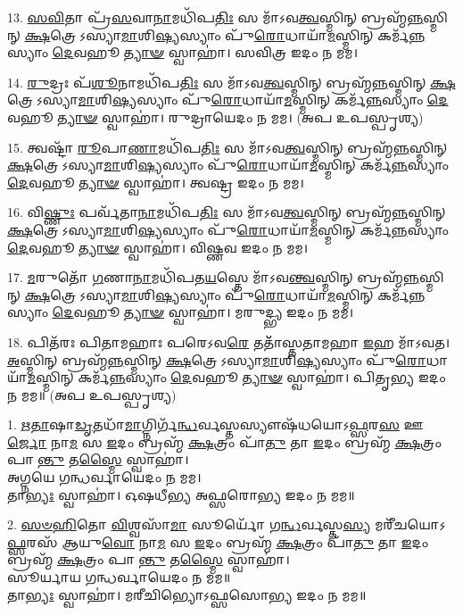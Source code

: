 13. \ul{𑌸}\-\-\ul{𑌵𑌿}\-𑌤𑌾 𑌪𑍍𑌰᳴\-\ul{𑌸}\-𑌵𑌾\-\ul{𑌨𑌾}\-𑌮𑌧𑌿᳴𑌪\-\ul{𑌤𑌿𑌃} 𑌸 𑌮𑌾᳴𑌽𑌵\-\ul{𑌤𑍍𑌵}\-𑌸𑍍𑌮𑌿𑌨𑍍 𑌬𑍍𑌰𑌹𑍍𑌮᳴\-\ul{𑌨𑍍𑌨}\-𑌸𑍍𑌮𑌿𑌨𑍍 \ul{𑌕𑍍𑌷}\-𑌤𑍍𑌰𑍇𑌽𑌸𑍍𑌯𑌾\-\ul{𑌮𑌾}\-𑌶𑌿\-\ul{𑌷𑍍𑌯}\-𑌸𑍍𑌯𑌾𑌂 𑌪𑍁᳴\-\ul{𑌰𑍋}\-𑌧𑌾𑌯𑌾᳴\-\ul{𑌮}\-𑌸𑍍𑌮𑌿𑌨𑍍 𑌕𑌰𑍍𑌮᳴\-\ul{𑌨𑍍𑌨}\-𑌸𑍍𑌯𑌾𑌂 \ul{𑌦𑍇}\-𑌵𑌹𑍂\-\ul{𑌤𑍍𑌯𑌾}\-\-\ul{𑍟} 𑌸𑍍𑌵𑌾𑌹𑌾॑। 𑌸𑌵𑌿𑌤𑍍𑌰 𑌇𑌦𑌂 𑌨 𑌮𑌮।

14. \ul{𑌰𑍁}\-𑌦𑍍𑌰𑌃 𑌪᳴\-\ul{𑌶𑍂}\-𑌨𑌾𑌮𑌧𑌿᳴𑌪\-\ul{𑌤𑌿𑌃} 𑌸 𑌮𑌾᳴𑌽𑌵\-\ul{𑌤𑍍𑌵}\-𑌸𑍍𑌮𑌿𑌨𑍍 𑌬𑍍𑌰𑌹𑍍𑌮᳴\-\ul{𑌨𑍍𑌨}\-𑌸𑍍𑌮𑌿𑌨𑍍 \ul{𑌕𑍍𑌷}\-𑌤𑍍𑌰𑍇𑌽𑌸𑍍𑌯𑌾\-\ul{𑌮𑌾}\-𑌶𑌿\-\ul{𑌷𑍍𑌯}\-𑌸𑍍𑌯𑌾𑌂 𑌪𑍁᳴\-\ul{𑌰𑍋}\-𑌧𑌾𑌯𑌾᳴\-\ul{𑌮}\-𑌸𑍍𑌮𑌿𑌨𑍍 𑌕𑌰𑍍𑌮᳴\-\ul{𑌨𑍍𑌨}\-𑌸𑍍𑌯𑌾𑌂 \ul{𑌦𑍇}\-𑌵𑌹𑍂\-\ul{𑌤𑍍𑌯𑌾}\-\-\ul{𑍟} 𑌸𑍍𑌵𑌾𑌹𑌾॑। 𑌰𑍁𑌦𑍍𑌰𑌾𑌯𑍇𑌦𑌂 𑌨 𑌮𑌮। (𑌅𑌪 𑌉𑌪𑌸𑍍𑌪𑍃𑌶𑍍𑌯)

15. 𑌤𑍍𑌵𑌷𑍍𑌟𑌾᳴ \ul{𑌰𑍂}\-𑌪𑌾\-\ul{𑌣𑌾}\-𑌮𑌧𑌿᳴𑌪\-\ul{𑌤𑌿𑌃} 𑌸 𑌮𑌾᳴𑌽𑌵\-\ul{𑌤𑍍𑌵}\-𑌸𑍍𑌮𑌿𑌨𑍍 𑌬𑍍𑌰𑌹𑍍𑌮᳴\-\ul{𑌨𑍍𑌨}\-𑌸𑍍𑌮𑌿𑌨𑍍 \ul{𑌕𑍍𑌷}\-𑌤𑍍𑌰𑍇𑌽𑌸𑍍𑌯𑌾\-\ul{𑌮𑌾}\-𑌶𑌿\-\ul{𑌷𑍍𑌯}\-𑌸𑍍𑌯𑌾𑌂 𑌪𑍁᳴\-\ul{𑌰𑍋}\-𑌧𑌾𑌯𑌾᳴\-\ul{𑌮}\-𑌸𑍍𑌮𑌿𑌨𑍍 𑌕𑌰𑍍𑌮᳴\-\ul{𑌨𑍍𑌨}\-𑌸𑍍𑌯𑌾𑌂 \ul{𑌦𑍇}\-𑌵𑌹𑍂\-\ul{𑌤𑍍𑌯𑌾}\-\-\ul{𑍟} 𑌸𑍍𑌵𑌾𑌹𑌾॑। 𑌤𑍍𑌵𑌷𑍍𑌟𑍍𑌰 𑌇𑌦𑌂 𑌨 𑌮𑌮।

16. 𑌵𑌿\-\ul{𑌷𑍍𑌣𑍁𑌃} 𑌪𑌰𑍍𑌵᳴𑌤𑌾\-\ul{𑌨𑌾}\-𑌮𑌧𑌿᳴𑌪\-\ul{𑌤𑌿𑌃} 𑌸 𑌮𑌾᳴𑌽𑌵\-\ul{𑌤𑍍𑌵}\-𑌸𑍍𑌮𑌿𑌨𑍍 𑌬𑍍𑌰𑌹𑍍𑌮᳴\-\ul{𑌨𑍍𑌨}\-𑌸𑍍𑌮𑌿𑌨𑍍 \ul{𑌕𑍍𑌷}\-𑌤𑍍𑌰𑍇𑌽𑌸𑍍𑌯𑌾\-\ul{𑌮𑌾}\-𑌶𑌿\-\ul{𑌷𑍍𑌯}\-𑌸𑍍𑌯𑌾𑌂 𑌪𑍁᳴\-\ul{𑌰𑍋}\-𑌧𑌾𑌯𑌾᳴\-\ul{𑌮}\-𑌸𑍍𑌮𑌿𑌨𑍍 𑌕𑌰𑍍𑌮᳴\-\ul{𑌨𑍍𑌨}\-𑌸𑍍𑌯𑌾𑌂 \ul{𑌦𑍇}\-𑌵𑌹𑍂\-\ul{𑌤𑍍𑌯𑌾}\-\-\ul{𑍟} 𑌸𑍍𑌵𑌾𑌹𑌾॑। 𑌵𑌿𑌷𑍍𑌣𑌵 𑌇𑌦𑌂 𑌨 𑌮𑌮।

17. \ul{𑌮}\-𑌰𑍁𑌤𑍋᳴ \ul{𑌗}\-𑌣𑌾\-\ul{𑌨𑌾}\-𑌮𑌧𑌿᳴𑌪𑌤\-\ul{𑌯}\-𑌸𑍍𑌤𑍇 𑌮𑌾᳴𑌽𑌵\-\ul{𑌨𑍍𑌤𑍍𑌵}\-𑌸𑍍𑌮𑌿𑌨𑍍 𑌬𑍍𑌰𑌹𑍍𑌮᳴\-\ul{𑌨𑍍𑌨}\-𑌸𑍍𑌮𑌿𑌨𑍍 \ul{𑌕𑍍𑌷}\-𑌤𑍍𑌰𑍇𑌽𑌸𑍍𑌯𑌾\-\ul{𑌮𑌾}\-𑌶𑌿\-\ul{𑌷𑍍𑌯}\-𑌸𑍍𑌯𑌾𑌂 𑌪𑍁᳴\-\ul{𑌰𑍋}\-𑌧𑌾𑌯𑌾᳴\-\ul{𑌮}\-𑌸𑍍𑌮𑌿𑌨𑍍 𑌕𑌰𑍍𑌮᳴\-\ul{𑌨𑍍𑌨}\-𑌸𑍍𑌯𑌾𑌂 \ul{𑌦𑍇}\-𑌵𑌹𑍂\-\ul{𑌤𑍍𑌯𑌾}\-\-\ul{𑍟} 𑌸𑍍𑌵𑌾𑌹𑌾॑। 𑌮𑌰𑍁𑌦𑍍𑌭𑍍𑌯 𑌇𑌦𑌂 𑌨 𑌮𑌮।

18. 𑌪𑌿𑌤᳴𑌰𑌃 𑌪𑌿𑌤𑌾𑌮𑌹𑌾𑌃 𑌪𑌰𑍇𑌽𑌵\-\ul{𑌰𑍇} 𑌤𑌤𑌾᳴᳴𑌸𑍍𑌤𑌤𑌾𑌮𑌹𑌾 \ul{𑌇}\-𑌹 𑌮𑌾᳴𑌽𑌵𑌤। \ul{𑌅}\-𑌸𑍍𑌮𑌿𑌨𑍍 𑌬𑍍𑌰𑌹𑍍𑌮᳴\-\ul{𑌨𑍍𑌨}\-𑌸𑍍𑌮𑌿𑌨𑍍 \ul{𑌕𑍍𑌷}\-𑌤𑍍𑌰𑍇𑌽𑌸𑍍𑌯𑌾\-\ul{𑌮𑌾}\-𑌶𑌿\-\ul{𑌷𑍍𑌯}\-𑌸𑍍𑌯𑌾𑌂 𑌪𑍁᳴\-\ul{𑌰𑍋}\-𑌧𑌾𑌯𑌾᳴\-\ul{𑌮}\-𑌸𑍍𑌮𑌿𑌨𑍍 𑌕𑌰𑍍𑌮᳴\-\ul{𑌨𑍍𑌨}\-𑌸𑍍𑌯𑌾𑌂 \ul{𑌦𑍇}\-𑌵𑌹𑍂\-\ul{𑌤𑍍𑌯𑌾}\-\-\ul{𑍟} 𑌸𑍍𑌵𑌾𑌹𑌾॑। 𑌪𑌿𑌤𑍃𑌭𑍍𑌯 𑌇𑌦𑌂 𑌨 𑌮𑌮॥ (𑌅𑌪 𑌉𑌪𑌸𑍍𑌪𑍃𑌶𑍍𑌯)


1. \ul{𑌋}\-\-\ul{𑌤𑌾}\-𑌷𑌾\-\ul{𑌡𑍃}\-𑌤𑌧𑌾᳴\-\ul{𑌮𑌾}\-𑌗𑍍𑌨𑌿𑌰𑍍𑌗᳴\-\ul{𑌨𑍍𑌧}\-𑌰𑍍𑌵𑌸𑍍𑌤𑌸𑍍𑌯𑍗𑌷᳴𑌧𑌯𑍋𑌽\-\ul{𑌫𑍍𑌸}\-𑌰\-\ul{𑌸} 𑌊\-\ul{𑌰𑍍𑌜𑍋} 𑌨𑌾\-\ul{𑌮}\-
𑌸 \ul{𑌇}\-𑌦𑌂 𑌬𑍍𑌰𑌹𑍍𑌮᳴ \ul{𑌕𑍍𑌷}\-𑌤𑍍𑌰𑌂 𑌪𑌾᳴\-\ul{𑌤𑍁} 𑌤𑌾 \ul{𑌇}\-𑌦𑌂 𑌬𑍍𑌰𑌹𑍍𑌮᳴ \ul{𑌕𑍍𑌷}\-𑌤𑍍𑌰𑌂 𑌪𑌾\-\ul{𑌨𑍍𑌤𑍁} 𑌤\-\ul{𑌸𑍍𑌮𑍈} 𑌸𑍍𑌵𑌾𑌹𑌾॑। \\
𑌅𑌗𑍍𑌨𑌯𑍇 𑌗𑌨𑍍𑌧𑌰𑍍𑌵𑌾𑌯𑍇𑌦𑌂 𑌨 𑌮𑌮।\\
𑌤𑌾\-\ul{𑌭𑍍𑌯𑌃} 𑌸𑍍𑌵𑌾𑌹𑌾॑। 𑌓𑌷𑌧𑍀𑌭𑍍𑌯 𑌅𑌫𑍍𑌸𑌰𑍋𑌭𑍍𑌯 𑌇𑌦𑌂 𑌨 𑌮𑌮॥

2. \ul{𑌸}\-\-\ul{𑍞}\-\-\ul{𑌹𑌿}\-𑌤𑍋 \ul{𑌵𑌿}\-𑌶𑍍𑌵𑌸𑌾᳴\-\ul{𑌮𑌾} 𑌸𑍂𑌰𑍍𑌯𑍋᳴ 𑌗\-\ul{𑌨𑍍𑌧}\-𑌰𑍍𑌵𑌸𑍍𑌤\-\ul{𑌸𑍍𑌯} 𑌮𑌰𑍀᳴𑌚𑌯𑍋𑌽\-\ul{𑌫𑍍𑌸}\-𑌰𑌸᳴ \ul{𑌆}\-𑌯𑍁\-\ul{𑌵𑍋} 𑌨𑌾\-\ul{𑌮} 𑌸 \ul{𑌇}\-𑌦𑌂 𑌬𑍍𑌰𑌹𑍍𑌮᳴ \ul{𑌕𑍍𑌷}\-𑌤𑍍𑌰𑌂 𑌪𑌾᳴\-\ul{𑌤𑍁} 𑌤𑌾 \ul{𑌇}\-𑌦𑌂 𑌬𑍍𑌰𑌹𑍍𑌮᳴ \ul{𑌕𑍍𑌷}\-𑌤𑍍𑌰𑌂 𑌪𑌾\-\ul{𑌨𑍍𑌤𑍁} 𑌤\-\ul{𑌸𑍍𑌮𑍈} 𑌸𑍍𑌵𑌾𑌹𑌾॑।\\
𑌸𑍂𑌰𑍍𑌯𑌾𑌯 𑌗𑌨𑍍𑌧𑌰𑍍𑌵𑌾𑌯𑍇𑌦𑌂 𑌨 𑌮𑌮॥\\
𑌤𑌾\-\ul{𑌭𑍍𑌯𑌃} 𑌸𑍍𑌵𑌾𑌹𑌾॑। 𑌮𑌰𑍀𑌚𑌿𑌭𑍍𑌯𑍋𑌽𑌫𑍍𑌸𑌸𑍋𑌭𑍍𑌯 𑌇𑌦𑌂 𑌨 𑌮𑌮॥

